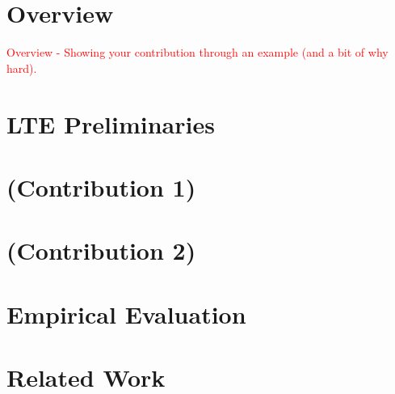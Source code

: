 \documentclass[acmsmall,review,authorversion]{acmart}
\begin{document}
\section{Overview}
\textcolor{red}{
Overview
- Showing your contribution through an example (and a bit of why hard).
}

\section{LTE Preliminaries}

\section{(Contribution 1)}

\section{(Contribution 2)}

\section{Empirical Evaluation}

\section{Related Work}
\end{document}
